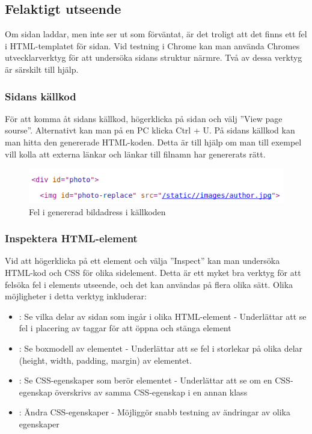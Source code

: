 \documentclass{TDP003mall}
\begin{document}
\subsection{Felaktigt utseende}
Om sidan laddar, men inte ser ut som förväntat, är det troligt att det finns ett fel i HTML-templatet för sidan. Vid testning i Chrome kan man använda Chromes utvecklarverktyg för att undersöka sidans struktur närmre. Två av dessa verktyg är särskilt till hjälp.

\subsubsection{Sidans källkod}
För att komma åt sidans källkod, högerklicka på sidan och välj ''View page sourse''. Alternativt kan man på en PC klicka Ctrl + U. På sidans källkod kan man hitta den genererade HTML-koden. Detta är till hjälp om man till exempel vill kolla att externa länkar och länkar till filnamn har genererats rätt.

\begin{figure}
  \centering
  \includegraphics{sourcecode}
  \caption{Fel i genererad bildadress i källkoden}
\end{figure}


\subsubsection{Inspektera HTML-element}
Vid att högerklicka på ett element och välja ''Inspect'' kan man undersöka HTML-kod och CSS för olika sidelement. Detta är ett myket bra verktyg för att felsöka fel i elements utseende, och det kan användas på flera olika sätt. Olika möjligheter i detta verktyg inkluderar:

\begin{itemize}
\item: Se vilka delar av sidan som ingår i olika HTML-element - Underlättar att se fel i placering av taggar för att öppna och stänga element
\item: Se boxmodell av elementet - Underlättar att se fel i storlekar på olika delar (height, width, padding, margin) av elementet.
\item: Se CSS-egenskaper som berör elementet - Underlättar att se om en CSS-egenskap överskrivs av samma CSS-egenskap i en annan klass
\item: Ändra CSS-egenskaper - Möjliggör snabb testning av ändringar av olika egenskaper
\end{itemize}
\end{document}
